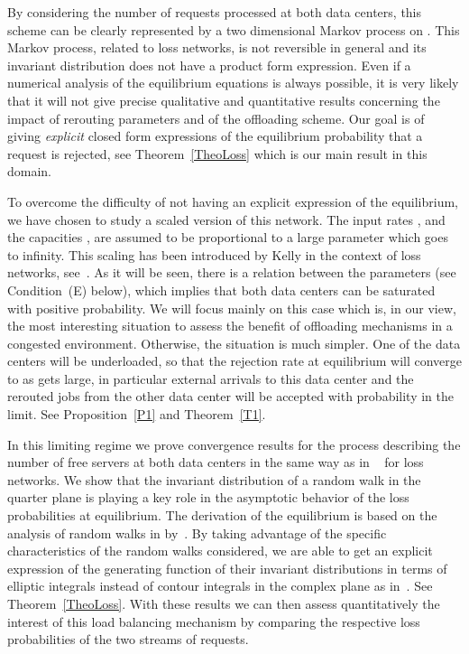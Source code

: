 \documentclass{amsart}
\begin{document}
By considering the number of requests processed at both data centers, this scheme can be clearly represented by a two dimensional Markov process on . This Markov process, related to loss networks, is not reversible in general and its invariant distribution {does not  have a product form expression.  Even if a numerical analysis of the equilibrium equations is always possible, it is very likely that it will not give precise qualitative and quantitative results concerning  the impact of  rerouting parameters  and  of the offloading scheme. Our goal is of giving {\em explicit} closed form expressions of the equilibrium probability that a request is rejected, see Theorem~\ref{TheoLoss} which is our main result in this domain. }

To overcome the difficulty of not having an explicit expression of the equilibrium, we have chosen to study a scaled version of this network. The input rates ,  and the capacities ,  are assumed to be proportional to a large parameter  which goes to infinity. {This scaling has been  introduced by Kelly in the context of loss networks, see~\cite{Kelly}. As it will be seen, there is a relation  between the parameters (see Condition~(E) below), which implies that both data centers can be saturated with positive probability. We will focus mainly on this case which is, in our view, the most interesting situation to assess the benefit of offloading mechanisms in a congested environment. Otherwise, the situation is much  simpler.  One of the data centers will be underloaded, so that the rejection rate at equilibrium will  converge to  as  gets large, in particular external arrivals to this data center and the rerouted jobs from the other data center will be accepted with probability  in the limit. See Proposition~\ref{P1} and Theorem~\ref{T1}. }

In this limiting regime we prove convergence results for the process describing the number of free servers at both data centers in the same way as in ~\cite{Hunt} for loss networks. {We show that the invariant distribution of a random walk in the quarter plane is playing a key role in the asymptotic behavior of the loss probabilities at equilibrium. The derivation of the equilibrium is based on the analysis of random walks in   by~\cite{FayolleIas}.  By taking advantage of the specific characteristics of the random walks considered, we are able to get an explicit expression of the generating function of their invariant distributions in terms of elliptic integrals instead of contour integrals in the complex plane as in~\cite{FayolleIas}. See Theorem~\ref{TheoLoss}. With these results we can then  assess quantitatively the interest of this load balancing mechanism by comparing the respective loss probabilities of the two streams of requests.}
\end{document}

